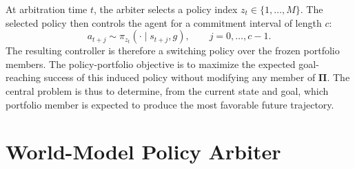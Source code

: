 \documentclass{article}
\theoremstyle{plain}
\theoremstyle{definition}
\theoremstyle{plain}
\newcommand{\wmpa}{\textsc{WMPA}}
\newcommand{\PiBank}{\boldsymbol{\Pi}}
\begin{document}
At arbitration time $t$, the arbiter selects a policy index $z_t\in\{1,\ldots,M\}$. The selected policy then controls the agent for a commitment interval of length $c$:
\[
    a_{t+j}\sim\pi_{z_t}(\cdot\mid s_{t+j},g),
    \qquad j=0,\ldots,c-1.
\]
The resulting controller is therefore a switching policy over the frozen portfolio members. The policy-portfolio objective is to maximize the expected goal-reaching success of this induced policy without modifying any member of $\PiBank$. The central problem is thus to determine, from the current state and goal, which portfolio member is expected to produce the most favorable future trajectory. 
\section{World-Model Policy Arbiter}
\label{sec:method}
\end{document}

